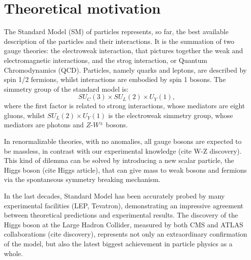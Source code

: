 \chapter{Theoretical motivation}
The Standard Model (SM) of particles represents, so far, the best available description of the particles and their interactions. It is the summation of two gauge theories: the electroweak interaction, that pictures together the weak and electromagnetic interactions, and the strog interaction, or Quantum Chromodynamics (QCD). Particles, namely quarks and leptons, are described by spin 1/2 fermions, whilst interactions are embodied by spin 1 bosons. The simmetry group of the standard model is:
\begin{equation}
SU_{C}(3) \times SU_L (2) \times U_Y (1),
\end{equation}
where the first factor is related to strong interactions, whose mediators are eight gluons, whilst $SU_L (2) \times U_Y (1)$ is the electroweak simmetry group, whose mediators are photons and $Z$-$W^{\pm}$ bosons.

In renormalizable theories, with no anomalies, all gauge bosons are expected to be massless, in contrast with our experimental knowledge (cite W-Z discovery). This kind of dilemma can be solved by introducing a new scalar particle, the Higgs boson (cite Higgs article), that can give mass to weak bosons and fermions via the spontaneous symmetry breaking mechanism. 

In the last decades, Standard Model has been accurately probed by many experimental facilities (LEP, Tevatron), demonstrating an impressive agreement between theoretical predictions and experimental results. The discovery of the Higgs boson at the Large Hadron Collider, measured by both CMS and ATLAS collaborations (cite discovery), represents not only an extraordinary confirmation of the model, but also the latest biggest achievement in particle physics as a whole.

